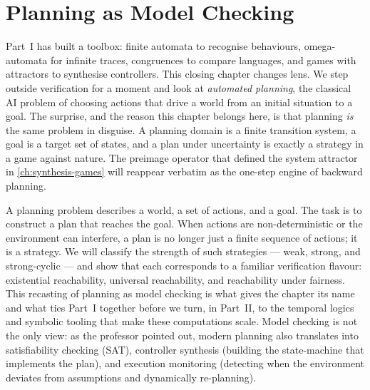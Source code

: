 
\chapter{Planning as Model Checking}
\label{ch:planning-model-checking}


Part~I has built a toolbox: finite automata to recognise behaviours,
omega-automata for infinite traces, congruences to compare languages,
and games with attractors to synthesise controllers.  This closing
chapter changes lens.  We step outside verification for a moment and
look at \emph{automated planning}, the classical AI problem of choosing
actions that drive a world from an initial situation to a goal.  The
surprise, and the reason this chapter belongs here, is that planning
\emph{is} the same problem in disguise.  A planning domain is a finite
transition system, a goal is a target set of states, and a plan under
uncertainty is exactly a strategy in a game against nature.  The
preimage operator that defined the system attractor in \cref{ch:synthesis-games}
will reappear verbatim as the one-step engine of backward planning.

A planning problem describes a world, a set of actions, and a goal.
The task is to construct a plan that reaches the goal.  When actions
are non-deterministic or the environment can interfere, a plan is no
longer just a finite sequence of actions; it is a strategy.  We will
classify the strength of such strategies --- weak, strong, and
strong-cyclic --- and show that each corresponds to a familiar
verification flavour: existential reachability, universal reachability,
and reachability under fairness.  This recasting of planning as model
checking is what gives the chapter its name and what ties Part~I
together before we turn, in Part~II, to the temporal logics and
symbolic tooling that make these computations scale.  Model checking
is not the only view: as the professor pointed out, modern planning
also translates into satisfiability checking (SAT), controller synthesis
(building the state-machine that implements the plan), and execution
monitoring (detecting when the environment deviates from assumptions
and dynamically re-planning).

